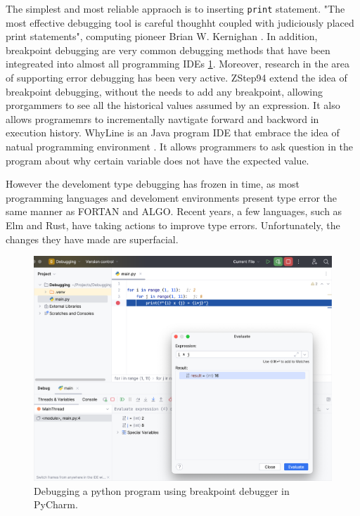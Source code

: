 The simplest and most reliable appraoch is to inserting \texttt{print} statement. "The most effective debugging tool is careful thoughht coupled with judiciously placed print statements", computing pioneer Brian W. Kernighan \cite{Kernighan1978-xs}.  In addition, breakpoint debugging are very common debugging methods that have been integreated into almost all programming IDEs \ref{fig:breakpoint}. Moreover, research in the area of supporting error debugging has been very active. ZStep94 \cite{Lieberman1995-lg} extend the idea of breakpoint debugging, without the needs to add any breakpoint, allowing prorgammers to see all the historical values assumed by an expression. It also allows programemrs to incrementally navtigate forward and backword in execution history. WhyLine \cite{Ko2009-uf} is an Java program IDE that embrace the idea of natual programming environment \cite{Myers2004-fy}. It allows programmers to ask question in the program about why certain variable does not have the expected value. 

However the develoment type debugging has frozen in time, as most programming languages and develoment environments present type error the same manner as FORTAN and ALGO. Recent years, a few languages, such as Elm and Rust, have taking actions to improve type errors. Unfortunately, the changes they have made are superfacial.

\begin{figure}[hbt]
  \includegraphics[width=\linewidth]{BreakPoint}
  \caption{
    \label{fig:breakpoint}
    Debugging a python program using breakpoint debugger in PyCharm.
    }
\end{figure}

